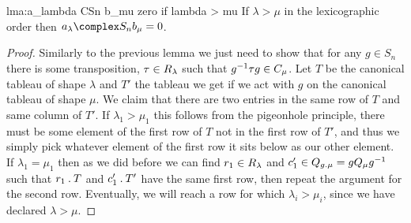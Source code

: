 \begin{lma}{}{lma:a_lambda CSn b_mu zero if lambda > mu}
    If \(\lambda > \mu\) in the lexicographic order then \(a_\lambda \complex S_n b_\mu = 0\).
    \begin{proof}
        Similarly to the previous lemma we just need to show that for any \(g \in S_n\) there is some transposition, \(\tau \in R_\lambda\) such that \(g^{-1}\tau g \in C_\mu\).
        Let \(T\) be the canonical tableau of shape \(\lambda\) and \(T'\) the tableau we get if we act with \(g\) on the canonical tableau of shape \(\mu\).
        We claim that there are two entries in the same row of \(T\) and same column of \(T'\).
        If \(\lambda_1 > \mu_1\) this follows from the pigeonhole principle, there must be some element of the first row of \(T\) not in the first row of \(T'\), and thus we simply pick whatever element of the first row it sits below as our other element.
        If \(\lambda_1 = \mu_1\) then as we did before we can find \(r_1 \in R_\lambda\) and \(c'_1 \in Q_{g \mathbin{.} \mu} = gQ_\mu g^{-1}\) such that \(r_1 \mathbin{.} T\) and \(c_1' \mathbin{.} T'\) have the same first row, then repeat the argument for the second row.
        Eventually, we will reach a row for which \(\lambda_i > \mu_i\), since we have declared \(\lambda > \mu\).
    \end{proof}
\end{lma}

